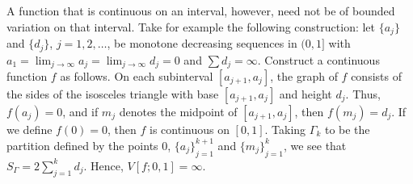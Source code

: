 \begin{example}
A function that is continuous on an interval, however, need not be of
bounded variation on that interval. Take for example the following
construction: let $\{a_j\}$ and $\{d_j\}$, $j=1,2,\dotsc$, be monotone
decreasing sequences in $(0,1]$ with $a_1=\lim_{j\to\infty}
a_j=\lim_{j\to\infty}d_j=0$ and $\sum d_j=\infty$. Construct a continuous
function $f$ as follows. On each subinterval $[a_{j+1},a_j]$, the graph of
$f$ consists of the sides of the isosceles triangle with base
$[a_{j+1},a_j]$ and height $d_j$. Thus, $f(a_j)=0$, and if $m_j$ denotes
the midpoint of $[a_{j+1},a_j]$, then $f(m_j)=d_j$. If we define $f(0)=0$,
then $f$ is continuous on $[0,1]$. Taking $\Gamma_k$ to be the partition
defined by the points $0$, ${\{a_j\}}_{j=1}^{k+1}$ and ${\{m_j\}}_{j=1}^k$,
we see that $S_\Gamma=2\sum_{j=1}^k d_j$. Hence, $V[f;0,1]=\infty$.
\end{example}

